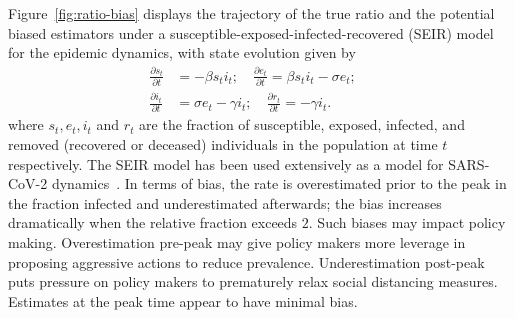 \documentclass[11pt]{amsart}
\numberwithin{equation}{section}
\theoremstyle{plain}
\begin{document}
 Figure~\ref{fig:ratio-bias} displays the trajectory of the true ratio and the potential biased estimators under a susceptible-exposed-infected-recovered (SEIR) model~\citep{Pastor2001,Newman2002,Parshani2010} for the epidemic dynamics, with state evolution given by
 \begin{align}
 \frac{\partial s_t}{\partial t} &= - \beta s_t i_t; \quad \frac{\partial e_t}{\partial t} = \beta s_t i_t - \sigma e_t; \quad \label{eq:seir} \\
 \frac{\partial i_t}{\partial t} &= \sigma e_t - \gamma i_t; \quad
 \frac{\partial r_t}{\partial t} = - \gamma i_t. \nonumber
\end{align}
 where $s_t, e_t, i_t$ and $r_t$ are the fraction of susceptible, exposed, infected, and removed (recovered or deceased) individuals in the population at time $t$ respectively.  The SEIR model has been used extensively as a model for SARS-CoV-2 dynamics~\cite{Song2020}.  In terms of bias, the rate is overestimated prior to the peak in the fraction infected and underestimated afterwards; the bias increases dramatically when the relative fraction exceeds $2$.  Such biases may impact policy making.  Overestimation pre-peak may give policy makers more leverage in proposing aggressive actions to reduce prevalence.  Underestimation post-peak puts pressure on policy makers to prematurely relax social distancing measures.  Estimates at the peak time appear to have minimal bias.
\end{document}
